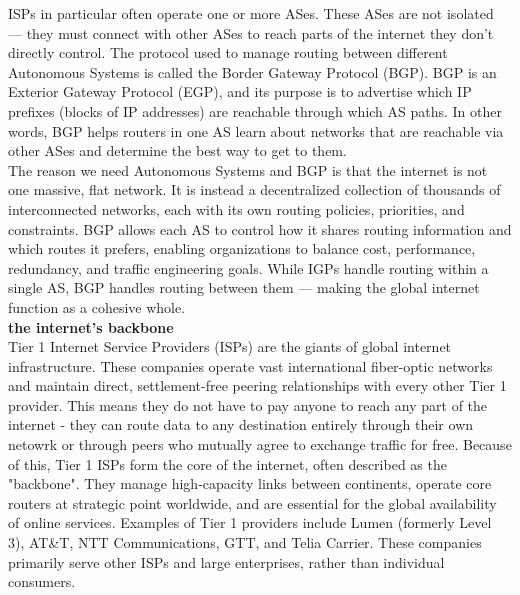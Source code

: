 \documentclass{article}
\begin{document}
ISPs in particular often operate one or more ASes. These ASes are not isolated — they must connect with other ASes to reach parts of the internet they don’t directly control. The protocol used to manage routing between different Autonomous Systems is called the Border Gateway Protocol (BGP). BGP is an Exterior Gateway Protocol (EGP), and its purpose is to advertise which IP prefixes (blocks of IP addresses) are reachable through which AS paths. In other words, BGP helps routers in one AS learn about networks that are reachable via other ASes and determine the best way to get to them.\\

The reason we need Autonomous Systems and BGP is that the internet is not one massive, flat network. It is instead a decentralized collection of thousands of interconnected networks, each with its own routing policies, priorities, and constraints. BGP allows each AS to control how it shares routing information and which routes it prefers, enabling organizations to balance cost, performance, redundancy, and traffic engineering goals. While IGPs handle routing within a single AS, BGP handles routing between them — making the global internet function as a cohesive whole.\\

\textbf{the internet's backbone}\\
Tier 1 Internet Service Providers (ISPs) are the giants of global internet infrastructure. These companies operate vast international fiber-optic networks and maintain direct, settlement-free peering relationships with every other Tier 1 provider. This means they do not have to pay anyone to reach any part of the internet - they can route data to any destination entirely through their own netowrk or through peers who mutually agree to exchange traffic for free. Because of this, Tier 1 ISPs form the core of the internet, often described as the "backbone". They manage high-capacity links between continents, operate core routers at strategic point worldwide, and are essential for the global availability of online services. Examples of Tier 1 providers include Lumen (formerly Level 3), AT\&T, NTT Communications, GTT, and Telia Carrier. These companies primarily serve other ISPs and large enterprises, rather than individual consumers.\\
\end{document}
